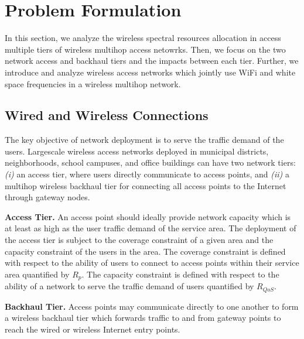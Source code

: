 \section{Problem Formulation}
\label{sec:problemformulation}

In this section, we analyze the wireless spectral resources allocation in access multiple tiers of wireless
multihop access netowrks. 
Then, we focus on the two network access and backhaul tiers and the impacts between each tier. 
Further, we introduce and analyze wireless access networks 
which jointly use WiFi and white space 
frequencies in a wireless multihop network. 


\subsection{Wired and Wireless Connections}

The key objective of network deployment is to serve the traffic demand of the users.
Largescale wireless access networks deployed in municipal districts, neighborhoods, school campuses, and office buildings 
can have two network tiers: {\it (i)} an access tier, where 
users directly communicate to access points, and {\it (ii)} a multihop wireless backhaul tier for connecting 
all access points to the Internet through gateway nodes. 


\textbf{Access Tier.} 
An access point should ideally provide network capacity which is at least as high as the user traffic demand of the service 
area. The deployment of the access tier is subject to the coverage constraint of a given area and the capacity 
constraint of the users in the area. The coverage constraint is defined with respect to the ability of 
users to connect to access points within their service area quantified by $R_p$. The capacity constraint is defined with 
respect to the ability of a network to serve the traffic demand of users quantified by $R_{QoS}$. 

\textbf{Backhaul Tier.} 
Access points may communicate directly to one another to form a wireless backhaul tier which forwards traffic to and from 
gateway points to reach the wired or wireless Internet entry points. 


